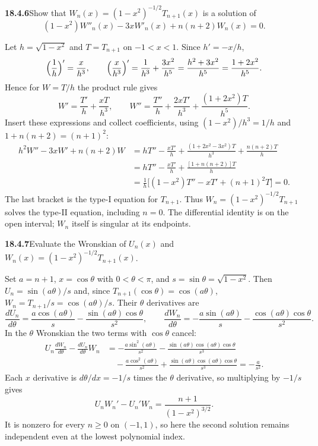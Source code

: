 \par\bigskip
\noindent\textbf{18.4.6}\quad Show that
$W_{n}(x)=(1-x^{2})^{-1/2}T_{n+1}(x)$ is a solution of
\[
(1-x^{2})W''_{n}(x)-3xW'_{n}(x)+n(n+2)W_{n}(x)=0.
\]
\par\nobreak
\solution
Let $h=\sqrt{1-x^2}$ and $T=T_{n+1}$ on $-1<x<1$.  Since $h'=-x/h$,
\[
\Bigl(\frac1h\Bigr)'=\frac{x}{h^3},\qquad
\Bigl(\frac{x}{h^3}\Bigr)'=\frac1{h^3}+\frac{3x^2}{h^5}
 =\frac{h^2+3x^2}{h^5}=\frac{1+2x^2}{h^5}.
\]
Hence for $W=T/h$ the product rule gives
\[
W'=\frac{T'}h+\frac{xT}{h^3},\qquad
W''=\frac{T''}h+\frac{2xT'}{h^3}
                    +\frac{(1+2x^2)T}{h^5}.
\]
Insert these expressions and collect coefficients, using
$(1-x^2)/h^3=1/h$ and $1+n(n+2)=(n+1)^2$:
\begin{align*}
h^2W''-3xW'+n(n+2)W
 &=hT''-\frac{xT'}h
   +\frac{(1+2x^2-3x^2)T}{h^3}
   +\frac{n(n+2)T}h\\
 &=hT''-\frac{xT'}h+\frac{[1+n(n+2)]T}h\\
 &=\frac1h\bigl[(1-x^2)T''-xT'+(n+1)^2T\bigr]=0.
\end{align*}
The last bracket is the type-I equation for $T_{n+1}$.
Thus $\boxed{W_n=(1-x^2)^{-1/2}T_{n+1}}$ solves the type-II
equation, including $n=0$.  The differential identity is on the
open interval; $W_n$ itself is singular at its endpoints.

\par\bigskip
\noindent\textbf{18.4.7}\quad Evaluate the Wronskian of $U_{n}(x)$
and $W_{n}(x)=(1-x^{2})^{-1/2}T_{n+1}(x)$.
\par\nobreak
\solution
Set $a=n+1$, $x=\cos\theta$ with $0<\theta<\pi$, and
$s=\sin\theta=\sqrt{1-x^2}$.  Then $U_n=\sin(a\theta)/s$ and, since
$T_{n+1}(\cos\theta)=\cos(a\theta)$, $W_n=T_{n+1}/s=\cos(a\theta)/s$.
Their $\theta$ derivatives are
\[
\frac{dU_n}{d\theta}=\frac{a\cos(a\theta)}s
                    -\frac{\sin(a\theta)\cos\theta}{s^2},
\qquad
\frac{dW_n}{d\theta}=-\frac{a\sin(a\theta)}s
                    -\frac{\cos(a\theta)\cos\theta}{s^2}.
\]
In the $\theta$ Wronskian the two terms with $\cos\theta$ cancel:
\begin{align*}
U_n\frac{dW_n}{d\theta}-\frac{dU_n}{d\theta}W_n
 &=-\frac{a\sin^2(a\theta)}{s^2}
   -\frac{\sin(a\theta)\cos(a\theta)\cos\theta}{s^3}\\
 &\quad-\frac{a\cos^2(a\theta)}{s^2}
   +\frac{\sin(a\theta)\cos(a\theta)\cos\theta}{s^3}
 =-\frac a{s^2}.
\end{align*}
Each $x$ derivative is $d\theta/dx=-1/s$ times the $\theta$
derivative, so multiplying by $-1/s$ gives
\[
\boxed{U_nW_n'-U_n'W_n=\frac{n+1}{(1-x^2)^{3/2}}}.
\]
It is nonzero for every $n\ge0$ on $(-1,1)$, so here the second
solution remains independent even at the lowest polynomial index.

